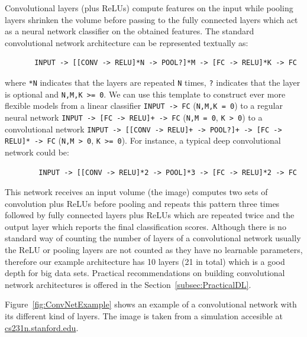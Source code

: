 \bigskip
Convolutional layers (plus ReLUs) compute features on the input while pooling layers shrinken the volume before passing to the fully connected layers which act as a neural network classifier on the obtained features. The standard convolutional network architecture can be represented textually as:
\begin{verbatim}
       INPUT -> [[CONV -> RELU]*N -> POOL?]*M -> [FC -> RELU]*K -> FC
\end{verbatim}
where \texttt{*N} indicates that the layers are repeated \texttt{N} times, \texttt{?} indicates that the layer is optional and \texttt{N,M,K >= 0}. We can use this template to construct ever more flexible models from a linear classifier \texttt{INPUT -> FC} (\texttt{N,M,K = 0}) to a regular neural network \texttt{INPUT -> [FC -> RELU]+ -> FC} (\texttt{N,M = 0}, \texttt{K > 0}) to a convolutional network \texttt{INPUT -> [[CONV -> RELU]+ -> POOL?]+ -> [FC -> RELU]* -> FC} (\texttt{N,M > 0}, \texttt{K >= 0}). For instance, a typical deep convolutional network could be:
\begin{verbatim}
        INPUT -> [[CONV -> RELU]*2 -> POOL]*3 -> [FC -> RELU]*2 -> FC
\end{verbatim}
This network receives an input volume (the image) computes two sets of convolution plus ReLUs before pooling and repeats this pattern three times followed by fully connected layers plus ReLUs which are repeated twice and the output layer which reports the final classification scores. Although there is no standard way of counting the number of layers of a convolutional network usually the ReLU or pooling layers are not counted as they have no learnable parameters, therefore our example architecture has 10 layers (21 in total) which is a good depth for big data sets. Practical recommendations on building convolutional network architectures is offered in the Section~\ref{subsec:PracticalDL}.

Figure~\ref{fig:ConvNetExample} shows an example of a convolutional network with its different kind of layers. The image is taken from a simulation accesible at \url{cs231n.stanford.edu}.

